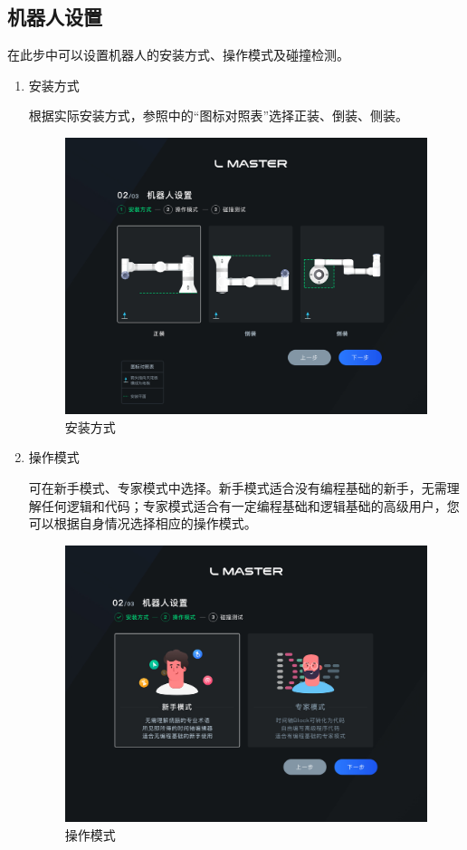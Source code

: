 \subsection{机器人设置}
在此步中可以设置机器人的安装方式、操作模式及碰撞检测。
\begin{enumerate}
\item 安装方式

	根据实际安装方式，参照中的“图标对照表”选择正装、倒装、侧装。

	\begin{figure}[ht]
		\centering
		\includegraphics[width=\textwidth]{image/33.pdf}
		\caption{安装方式}
		\label{fig:安装方式}
	\end{figure}


\item 操作模式

	可在新手模式、专家模式中选择。新手模式适合没有编程基础的新手，无需理解任何逻辑和代码；专家模式适合有一定编程基础和逻辑基础的高级用户，您可以根据自身情况选择相应的操作模式。

	\begin{figure}[ht]
		\centering
		\includegraphics[width=\textwidth]{image/32.pdf}
		\caption{操作模式}
		\label{fig:操作模式}
	\end{figure}


\end{enumerate}
